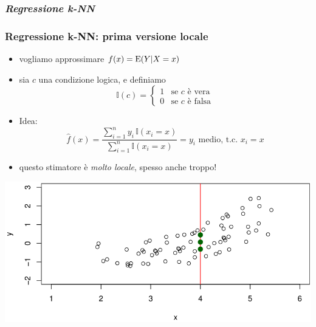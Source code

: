 \subsubsection[Regressione k-NN]{\textit{Regressione k-NN}}
\begin{frame}

	\frametitle{Regressione k-NN: prima versione locale}

	\begin{itemize}
		\item vogliamo approssimare $f(x) = \mbox{{\textup{E}}}(Y|X=x)$
		\item sia $c$ una condizione logica, e definiamo
			\[
				\mathbb{I}(c) = \left\{\begin{array}{ll} 1 & \mbox{se $c$ è vera} \\
				0 & \mbox{se $c$ è falsa}
				\end{array} \right.
			\]
		\item Idea:
		\[
			\widehat{f}(x) = \frac{\sum_{i=1}^n y_i \, \mathbb{I}(x_i=x)}{\sum_{i=1}^n \mathbb{I}(x_i=x)} = \mbox{$y_i$ medio, t.c. $x_i=x$}
		\]
		\item questo stimatore è \emph{molto locale}, spesso anche troppo!
	\end{itemize}
	
	\begin{center}
		\includegraphics[width=0.6\linewidth]{images/supervised/knn_regression/knn_regression_local.png}
	\end{center}
\end{frame}



